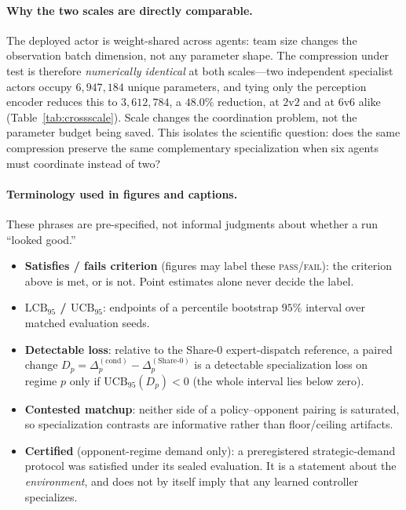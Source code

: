 \paragraph{Why the two scales are directly comparable.}
The deployed actor is weight-shared across agents: team size changes the
observation batch dimension, not any parameter shape. The compression under test
is therefore \emph{numerically identical} at both scales---two independent
specialist actors occupy $6{,}947{,}184$ unique parameters, and tying only the
perception encoder reduces this to $3{,}612{,}784$, a $48.0\%$ reduction, at
$2$v$2$ and at $6$v$6$ alike (Table~\ref{tab:crossscale}). Scale changes the
coordination problem, not the parameter budget being saved. This isolates the
scientific question: does the same compression preserve the same complementary
specialization when six agents must coordinate instead of two?

\paragraph{Terminology used in figures and captions.}
These phrases are pre-specified, not informal judgments about whether a run
``looked good.''
\begin{itemize}
  \item \textbf{Satisfies / fails criterion} (figures may label these
  \textsc{pass}/\textsc{fail}): the criterion above is met, or is not. Point
  estimates alone never decide the label.
  \item \textbf{$\mathrm{LCB}_{95}$ / $\mathrm{UCB}_{95}$}: endpoints of a
  percentile bootstrap $95\%$ interval over matched evaluation seeds.
  \item \textbf{Detectable loss}: relative to the Share-0 expert-dispatch
  reference, a paired change
  $D_p=\Delta_p^{(\mathrm{cond})}-\Delta_p^{(\mathrm{Share\textrm{-}0})}$ is a
  detectable specialization loss on regime $p$ only if
  $\mathrm{UCB}_{95}(D_p)<0$ (the whole interval lies below zero).
  \item \textbf{Contested matchup}: neither side of a policy--opponent pairing is
  saturated, so specialization contrasts are informative rather than
  floor/ceiling artifacts.
  \item \textbf{Certified} (opponent-regime demand only): a preregistered
  strategic-demand protocol was satisfied under its sealed evaluation. It is a
  statement about the \emph{environment}, and does not by itself imply that any
  learned controller specializes.
\end{itemize}

